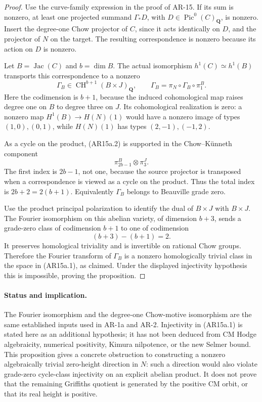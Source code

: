 \documentclass[11pt,a4paper]{article}
\begin{document}
\begin{proof}
Use the curve-family expression in the proof of AR-15. If its sum is
nonzero, at least one projected summand
\(\Gamma_*D\), with \(D\in\operatorname{Pic}^0(C)_{\mathbf Q}\),
is nonzero. Insert the degree-one Chow projector of \(C\), since it
acts identically on \(D\), and the projector of \(N\) on the target.
The resulting correspondence is nonzero because its action on \(D\)
is nonzero.

Let \(B=\operatorname{Jac}(C)\) and \(b=\dim B\). The actual isomorphism
\(h^1(C)\simeq h^1(B)\) transports this correspondence to a nonzero
\[
 \Gamma_B\in\operatorname{CH}^{b+1}(B\times J)_{\mathbf Q},
 \qquad
 \Gamma_B=\pi_N\circ\Gamma_B\circ\pi_1^B.
 \tag{AR15a.2}
\]
Here the codimension is \(b+1\), because the induced cohomological
map raises degree one on \(B\) to degree three on \(J\).
Its cohomological realization is zero: a nonzero map
\(H^1(B)\to H(N)(1)\) would have a nonzero image of types
\((1,0),(0,1)\), while \(H(N)(1)\) has types
\((2,-1),(-1,2)\).

As a cycle on the product, (AR15a.2) is supported in the Chow--K\"unneth
component
\[
        \pi_{2b-1}^B\otimes\pi_3^J.
\]
The first index is \(2b-1\), not one, because the source projector
is transposed when a correspondence is viewed as a cycle on the
product. Thus the total index is \(2b+2=2(b+1)\).
Equivalently \(\Gamma_B\) belongs to Beauville grade zero.

Use the product principal polarization to identify the dual of
\(B\times J\) with \(B\times J\). The Fourier isomorphism on this
abelian variety, of dimension \(b+3\), sends a grade-zero class of codimension \(b+1\)
to one of codimension
\[
             (b+3)-(b+1)=2.
\]
It preserves homological triviality and is invertible on rational
Chow groups. Therefore the Fourier transform of \(\Gamma_B\) is a
nonzero homologically trivial class in the space in (AR15a.1), as
claimed. Under the displayed injectivity hypothesis this is
impossible, proving the proposition.
\end{proof}

\paragraph{Status and implication.}
The Fourier isomorphism and the degree-one Chow-motive isomorphism
are the same established inputs used in AR-1a and AR-2.
Injectivity in (AR15a.1) is stated here as an additional hypothesis;
it has not been deduced from CM Hodge algebraicity, numerical
positivity, Kimura nilpotence, or the new Selmer bound.
This proposition gives a concrete obstruction to constructing a
nonzero algebraically trivial zero-height direction in \(N\):
such a direction would also violate grade-zero cycle-class
injectivity on an explicit abelian product. It does not prove
that the remaining Griffiths quotient is generated by the
positive CM orbit, or that its real height is positive.
\end{document}
